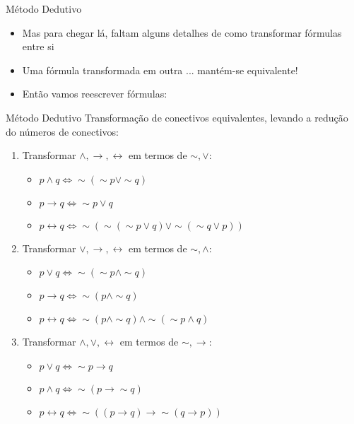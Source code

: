 \begin{frame}[t]{Método Dedutivo}

\begin{itemize}

\item Mas para chegar lá, faltam alguns detalhes de como transformar fórmulas entre si
\item Uma fórmula transformada em outra ... mantém-se equivalente!

\item Então vamos reescrever fórmulas:

\end{itemize}


\end{frame}

\begin{frame}[t]{Método Dedutivo}
  Transformação de conectivos equivalentes, levando a redução do números de conectivos:

	\begin{enumerate}
	\item Transformar $\wedge, \rightarrow, \leftrightarrow$ em termos de $\sim, \vee$:
	\begin{itemize}
	\item $p \wedge q \Leftrightarrow \sim(\sim p \vee\sim q)$
	\item $p \rightarrow q \Leftrightarrow \sim p \vee q$
	\item $p \leftrightarrow q \Leftrightarrow \sim (\sim (\sim p \vee q) \vee\sim (\sim q \vee p))$
	\end{itemize}

		\item Transformar  $\vee, \rightarrow, \leftrightarrow$ em termos de $\sim, \wedge$:
	\begin{itemize}
	\item $p \vee q \Leftrightarrow \sim (\sim p \wedge\sim q)$
	\item $p \rightarrow q \Leftrightarrow \sim (p \wedge\sim q)$
	\item $p \leftrightarrow q \Leftrightarrow \sim (p \wedge\sim q) \wedge\sim (\sim p \wedge q)$
	\end{itemize}

		\item Transformar  $\wedge, \vee, \leftrightarrow$ em termos de $\sim, \rightarrow$:
	\begin{itemize}
	\item $p \vee q \Leftrightarrow \sim p \rightarrow q$
	\item $p \wedge q \Leftrightarrow \sim (p \rightarrow\sim q)$
	\item $p \leftrightarrow q \Leftrightarrow \sim ((p \rightarrow q) \rightarrow\sim (q \rightarrow p))$
	\end{itemize}
	\end{enumerate}
\end{frame}




